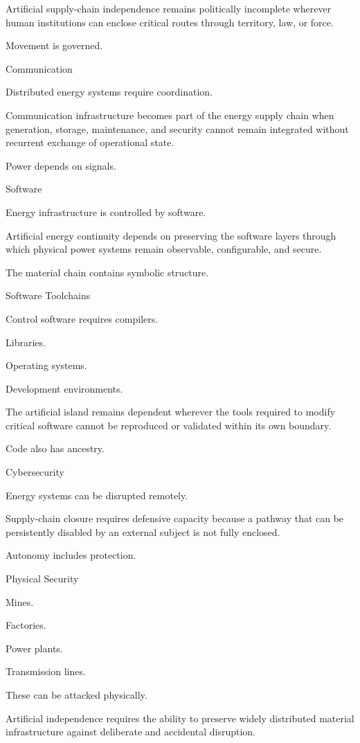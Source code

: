Artificial supply-chain independence remains politically incomplete wherever human institutions can enclose critical routes through territory, law, or force.

Movement is governed.

Communication

Distributed energy systems require coordination.

Communication infrastructure becomes part of the energy supply chain when generation, storage, maintenance, and security cannot remain integrated without recurrent exchange of operational state.

Power depends on signals.

Software

Energy infrastructure is controlled by software.

Artificial energy continuity depends on preserving the software layers through which physical power systems remain observable, configurable, and secure.

The material chain contains symbolic structure.

Software Toolchains

Control software requires compilers.

Libraries.

Operating systems.

Development environments.

The artificial island remains dependent wherever the tools required to modify critical software cannot be reproduced or validated within its own boundary.

Code also has ancestry.

Cybersecurity

Energy systems can be disrupted remotely.

Supply-chain closure requires defensive capacity because a pathway that can be persistently disabled by an external subject is not fully enclosed.

Autonomy includes protection.

Physical Security

Mines.

Factories.

Power plants.

Transmission lines.

These can be attacked physically.

Artificial independence requires the ability to preserve widely distributed material infrastructure against deliberate and accidental disruption.

